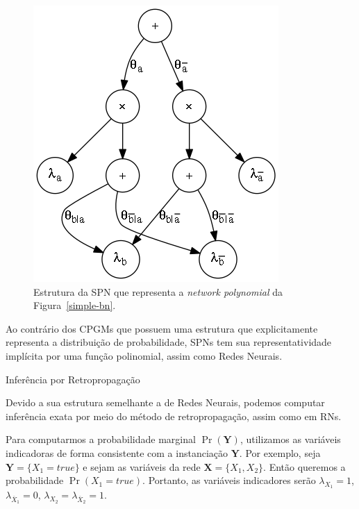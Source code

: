 \documentclass{amsart}
\makeatletter
\def\subsection{\@startsection{subsection}{3}%
  \z@{.5\linespacing\@plus.7\linespacing}{.1\linespacing}%
  {\normalfont\itshape}}
\theoremstyle{plain}
\numberwithin{equation}{subsection}
\newcommand{\set}[1]{\mathbf{#1}}
\makeatother
\begin{document}
\begin{figure}[h]
  \centering\includegraphics[scale=0.4]{graphs/simple_spn.png}
  \caption{Estrutura da SPN que representa a \textit{network polynomial} da
  Figura~\ref{simple-bn}.}\label{simple-spn}
\end{figure}

Ao contrário dos CPGMs que possuem uma estrutura que explicitamente representa a distribuição de
probabilidade, SPNs tem sua representatividade implícita por uma função polinomial, assim como
Redes Neurais.

\subsection{Inferência por Retropropagação}

Devido a sua estrutura semelhante a de Redes Neurais, podemos computar inferência exata por meio
do método de retropropagação, assim como em RNs.

Para computarmos a probabilidade marginal $\Pr(\set{Y})$, utilizamos as variáveis indicadoras de
forma consistente com a instanciação $\set{Y}$. Por exemplo, seja $\set{Y}=\{X_1=true\}$ e sejam
as variáveis da rede $\set{X}=\{X_1,X_2\}$. Então queremos a probabilidade $\Pr(X_1=true)$.
Portanto, as variáveis indicadores serão $\lambda_{X_1}=1$, $\lambda_{\overline{X}_1}=0$,
$\lambda_{X_2}=\lambda_{\overline{X}_2}=1$.
\end{document}
